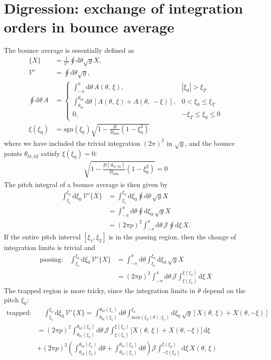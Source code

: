 \documentclass[11pt,a4paper]{article}
\newcommand{\rd}{\ensuremath{\mathrm{d}}}
\newcommand{\sub}[1]{\ensuremath{_{\text{#1}}}}
\newcommand{\Vp}{\ensuremath{\mathcal{V}'} }
\begin{document}
\section{Digression: exchange of integration orders in bounce average}\label{sec:switcheroo}
The bounce average is essentially defined as 
\begin{align}
\{X\} &= \frac{1}{\Vp}\oint\rd\theta\sqrt{g} X, \\
\Vp &= \oint\rd\theta\sqrt{g}, \\
\oint \rd \theta  \, A&= 
\begin{cases}
        \int_{-\pi}^{\pi}\rd\theta \, A(\theta,\,\xi), & |\xi_0|>\xi_T  \\
        \int_{\theta_{b1}}^{\theta_{b2}}\rd\theta \, [A(\theta,\,\xi)  + A(\theta,\,-\xi) ],&0 < \xi_0 \leq \xi_T  \\
        0 , & -\xi_T \leq \xi_0 \leq 0
\end{cases} \\
\xi(\xi_0) &= \text{sgn}(\xi_0)\sqrt{1 - \frac{B}{B\sub{min}}(1-\xi_0^2)}
\end{align}
where we have included the trivial integration $(2\pi)^2$ in $\sqrt{g}$, and the bounce points $\theta_{b1,b2}$ satisfy $\xi(\xi_0)=0$:
\begin{align}
\sqrt{1-\frac{B(\theta_{b1,b2})}{B\sub{min}}(1-\xi_0^2)} = 0
\end{align}
The pitch integral of a bounce average is then given by
\begin{align}
\int_{\xi_1}^{\xi_2} \rd \xi_0 \, \Vp \{X\} &= \int_{\xi_1}^{\xi_2} \rd \xi_0 \oint \rd\theta \, \sqrt{g}X \nonumber \\
&= \int_{-\pi}^\pi \rd\theta \oint \rd \xi_0 \,\sqrt{g} X \\
&= (2\pi p)^2 \int_{-\pi}^\pi \rd\theta \,\mathcal{J}\oint \rd \xi \, X.
\end{align}
If the entire pitch interval $[\xi_1,\xi_2]$ is in the passing region, then the change of integration limits is trivial and 
\begin{align}
\text{passing:} \quad \int_{\xi_1}^{\xi_2} \rd\xi_0 \, \Vp \{X\} 
&= \int_{-\pi}^\pi \rd \theta \int_{\xi_1}^{\xi_2} \rd \xi_0 \, \sqrt{g} X 
\nonumber \\
&=(2\pi p)^2\int_{-\pi}^\pi \rd \theta \,\mathcal{J}\int_{\xi(\xi_1)}^{\xi(\xi_2)} \rd \xi \, X 
\end{align}
The trapped region is more tricky, since the integration limits in $\theta$ depend on the pitch $\xi_0$:
\begin{align}
\text{trapped:} &\quad \int_{\xi_1}^{\xi_2} \rd\xi_0 \, \Vp \{X\} 
= \int_{\theta_{b1}(\xi_1)}^{\theta_{b2}(\xi_1)} \rd\theta \int_{\mathrm{max}(\xi_T(\theta),\xi_1)}^{\xi_2} \rd \xi_0 \,\sqrt{g}[ X(\theta,\,\xi) + X(\theta,-\xi) ]\\
&= (2\pi p)^2\int_{\theta_{b1}(\xi_2)}^{\theta_{b2}(\xi_2)} \rd\theta \,\mathcal{J} \int_{\xi(\xi_1)}^{\xi(\xi_2)} \Big[X(\theta,\,\xi) + X(\theta, -\xi)\Big] \,\rd\xi
\nonumber \\
&+(2\pi p)^2\left(\int_{\theta_{b2}(\xi_2)}^{\theta_{b2}(\xi_1)}\rd\theta + \int_{\theta_{b1}(\xi_1)}^{\theta_{b1}(\xi_2)}\rd\theta\right)\mathcal{J} \int_{-\xi(\xi_2)}^{\xi(\xi_2)} \rd \xi \, X(\theta,\,\xi) 
\end{align}
\end{document}
